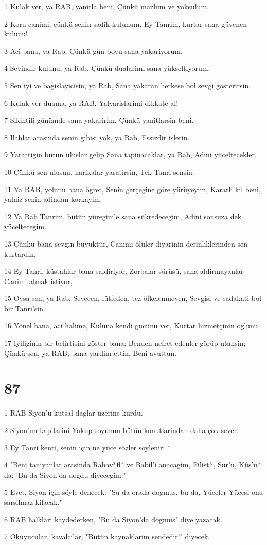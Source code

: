 \par 1 Kulak ver, ya RAB, yanitla beni, Çünkü mazlum ve yoksulum.
\par 2 Koru canimi, çünkü senin sadik kulunum. Ey Tanrim, kurtar sana güvenen kulunu!
\par 3 Aci bana, ya Rab, Çünkü gün boyu sana yakariyorum.
\par 4 Sevindir kulunu, ya Rab, Çünkü dualarimi sana yükseltiyorum.
\par 5 Sen iyi ve bagislayicisin, ya Rab, Sana yakaran herkese bol sevgi gösterirsin.
\par 6 Kulak ver duama, ya RAB, Yalvarislarimi dikkate al!
\par 7 Sikintili günümde sana yakaririm, Çünkü yanitlarsin beni.
\par 8 Ilahlar arasinda senin gibisi yok, ya Rab, Essizdir islerin.
\par 9 Yarattigin bütün uluslar gelip Sana tapinacaklar, ya Rab, Adini yüceltecekler.
\par 10 Çünkü sen ulusun, harikalar yaratirsin, Tek Tanri sensin.
\par 11 Ya RAB, yolunu bana ögret, Senin gerçegine göre yürüyeyim, Kararli kil beni, yalniz senin adindan korkayim.
\par 12 Ya Rab Tanrim, bütün yüregimle sana sükredecegim, Adini sonsuza dek yüceltecegim.
\par 13 Çünkü bana sevgin büyüktür, Canimi ölüler diyarinin derinliklerinden sen kurtardin.
\par 14 Ey Tanri, küstahlar bana saldiriyor, Zorbalar sürüsü, sana aldirmayanlar Canimi almak istiyor,
\par 15 Oysa sen, ya Rab, Sevecen, lütfeden, tez öfkelenmeyen, Sevgisi ve sadakati bol bir Tanri'sin.
\par 16 Yönel bana, aci halime, Kuluna kendi gücünü ver, Kurtar hizmetçinin oglunu.
\par 17 Iyiliginin bir belirtisini göster bana; Benden nefret edenler görüp utansin; Çünkü sen, ya RAB, bana yardim ettin, Beni avuttun.

\chapter{87}

\par 1 RAB Siyon'u kutsal daglar üzerine kurdu.
\par 2 Siyon'un kapilarini Yakup soyunun bütün konutlarindan daha çok sever.
\par 3 Ey Tanri kenti, senin için ne yüce sözler söylenir: *
\par 4 "Beni taniyanlar arasinda Rahav*fl* ve Babil'i anacagim, Filist'i, Sur'u, Kûs'u* da; 'Bu da Siyon'da dogdu diyecegim."
\par 5 Evet, Siyon için söyle denecek: "Su da orada dogmus, bu da, Yüceler Yücesi onu sarsilmaz kilacak."
\par 6 RAB halklari kaydederken, "Bu da Siyon'da dogmus" diye yazacak.
\par 7 Okuyucular, kavalcilar, "Bütün kaynaklarim sendedir!" diyecek.

